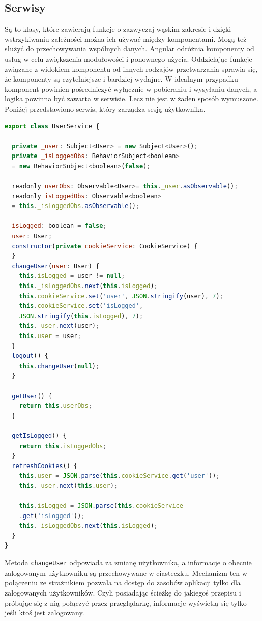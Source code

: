    \subsection{Serwisy}
   Są to klasy, które zawierają funkcje o zazwyczaj wąskim zakresie i dzięki wstrzykiwaniu zależności można ich używać między komponentami. Mogą też służyć do przechowywania wspólnych danych. Angular odróżnia komponenty od usług w celu zwiększenia modułowości i ponownego użycia.\cite{angulararch} Oddzielając funkcje związane z widokiem komponentu od innych rodzajów przetwarzania sprawia się, że komponenty są czytelniejsze i bardziej wydajne. W idealnym przypadku komponent powinien pośredniczyć wyłącznie w pobieraniu i wysyłaniu danych, a logika powinna być zawarta w serwisie. Lecz nie jest w żaden sposób wymuszone.\\
   Poniżej przedstawiono serwis, który zarządza sesją użytkownika.
   \begin{lstlisting}[language=JavaScript] 
  export class UserService {

  private _user: Subject<User> = new Subject<User>();
  private _isLoggedObs: BehaviorSubject<boolean>
  = new BehaviorSubject<boolean>(false);

  readonly userObs: Observable<User>= this._user.asObservable();
  readonly isLoggedObs: Observable<boolean>
  = this._isLoggedObs.asObservable();

  isLogged: boolean = false;
  user: User;
  constructor(private cookieService: CookieService) {
  }
  changeUser(user: User) {
    this.isLogged = user != null;
    this._isLoggedObs.next(this.isLogged);
    this.cookieService.set('user', JSON.stringify(user), 7);
    this.cookieService.set('isLogged',
    JSON.stringify(this.isLogged), 7);
    this._user.next(user);
    this.user = user;
  }
  logout() {
    this.changeUser(null);
  }

  getUser() {
    return this.userObs;
  }

  getIsLogged() {
    return this.isLoggedObs;
  }
  refreshCookies() {
    this.user = JSON.parse(this.cookieService.get('user'));
    this._user.next(this.user);

    this.isLogged = JSON.parse(this.cookieService
    .get('isLogged'));
    this._isLoggedObs.next(this.isLogged);
  }
}
  \end{lstlisting}
  Metoda \texttt{changeUser} odpowiada za zmianę użytkownika, a informacje o obecnie zalogowanym użytkowniku są przechowywane w ciasteczku. Mechanizm ten w połączeniu ze strażnikiem pozwala na dostęp do zasobów aplikacji tylko dla zalogowanych użytkowników. Czyli posiadając ścieżkę do jakiegoś przepisu i próbując się z nią połączyć przez przeglądarkę, informacje wyświetlą się tylko jeśli ktoś jest zalogowany.
